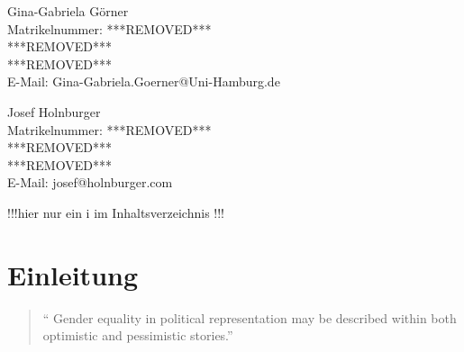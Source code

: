 \documentclass[12pt, 
    twoside=false, 
    bibliography=totoc, 
    numbers=endperiod, 
    headings=normal, 
    toc=chapterentrydotfill
    ]{scrbook}
\begin{document}
\begin{titlepage}
	\begin{minipage}[t]{0.48\textwidth}
    \flushleft 
    Gina-Gabriela Görner \\
    Matrikelnummer: ***REMOVED*** \\
    ***REMOVED*** \vspace{0.1cm} \\ 
	***REMOVED*** \vspace{0.1cm}  \\
	E-Mail: Gina-Gabriela.Goerner@Uni-Hamburg.de \\ 
    \end{minipage}
    \begin{minipage}[t]{0.48\textwidth}
	\flushleft
	Josef Holnburger \\
	Matrikelnummer: ***REMOVED*** \\
	***REMOVED*** \vspace{0.1cm} \\
	***REMOVED*** \vspace{0.1cm} \\
	E-Mail: josef@holnburger.com \\
    \end{minipage}

\end{titlepage}

\frontmatter

\tableofcontents

\listoffigures
{} !!!hier nur ein i im Inhaltsverzeichnis !!!
\vspace*{24pt}
{\let\clearpage\relax \listoftables}	

\mainmatter



\chapter{Einleitung}\label{Einleitung} 

\begin{quote}
    \enquote{ Gender equality in political representation may be described within both optimistic and pessimistic stories.} \parencite[149]{celis_2018}
\end{quote}
\end{document}

